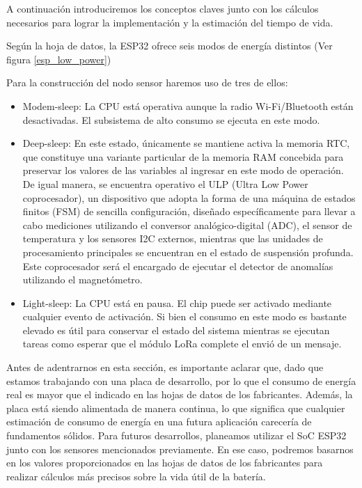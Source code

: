 A continuación introduciremos los conceptos claves junto con los cálculos necesarios
para lograr la implementación y la estimación del tiempo de vida.

Según la hoja de datos, la ESP32 ofrece seis modos de energía distintos (Ver figura \ref{esp_low_power})


Para la construcción del nodo sensor haremos uso de tres de ellos:
\begin{itemize}
    \item Modem-sleep: La CPU está operativa aunque la radio Wi-Fi/Bluetooth están desactivadas. El subsistema de alto consumo se ejecuta en este modo.
    \item Deep-sleep: En este estado, únicamente se mantiene activa la memoria RTC, que constituye una variante particular de la memoria RAM concebida para preservar los valores de las variables al ingresar en este modo de operación. De igual manera, se encuentra operativo el ULP (Ultra Low Power coprocesador), un dispositivo que adopta la forma de una máquina de estados finitos (FSM) de sencilla configuración, diseñado específicamente para llevar a cabo mediciones utilizando el conversor analógico-digital (ADC), el sensor de temperatura y los sensores I2C externos, mientras que las unidades de procesamiento principales se encuentran en el estado de suspensión profunda. Este coprocesador será el encargado de ejecutar el detector de anomalías utilizando el magnetómetro.
    \item Light-sleep: La CPU está en pausa. El chip puede ser activado mediante cualquier evento de activación. Si bien el consumo en este modo es bastante elevado es útil para conservar el estado del sistema mientras se ejecutan tareas como esperar que el módulo LoRa complete el envió de un mensaje.
\end{itemize}



Antes de adentrarnos en esta sección, es importante aclarar que, dado que estamos trabajando con una placa de desarrollo, por lo que el consumo de energía real es mayor que el indicado en las hojas de datos de los fabricantes. Además, la placa está siendo alimentada de manera continua, lo que significa que cualquier estimación de consumo de energía en una futura aplicación carecería de fundamentos sólidos. Para futuros desarrollos, planeamos utilizar el SoC ESP32 junto con los sensores mencionados previamente. En ese caso, podremos basarnos en los valores proporcionados en las hojas de datos de los fabricantes para realizar cálculos más precisos sobre la vida útil de la batería.

